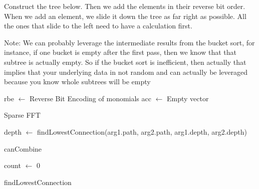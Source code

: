 Construct the tree below.
Then we add the elements in their reverse bit order. When we add an element, we slide it down the tree as far right as possible. All the ones that slide to the left need to have a calculation first.

Note: We can probably leverage the intermediate results from the bucket sort, for instance, if one bucket is empty after the first pass, then we know that that subtree is actually empty. So if the bucket sort is inefficient, then actually that implies that your underlying data in not random and can actually be leveraged because you know whole subtrees will be empty

\begin{algorithm}[H]
  \SetAlgoLined
  rbe $\gets$ Reverse Bit Encoding of monomials\;
  acc $\gets$ Empty vector\; 
  \caption{Sparse FFT}
\end{algorithm}


\begin{algorithm}[H]
  \SetAlgoLined
  depth $\gets$ findLowestConnection(arg1.path, arg2.path, arg1.depth, arg2.depth)\;
  \;
  \caption{canCombine}
\end{algorithm}

\begin{algorithm}[H]
  \SetAlgoLined
  count $\gets$ 0\;
  \caption{findLowestConnection}
\end{algorithm}

